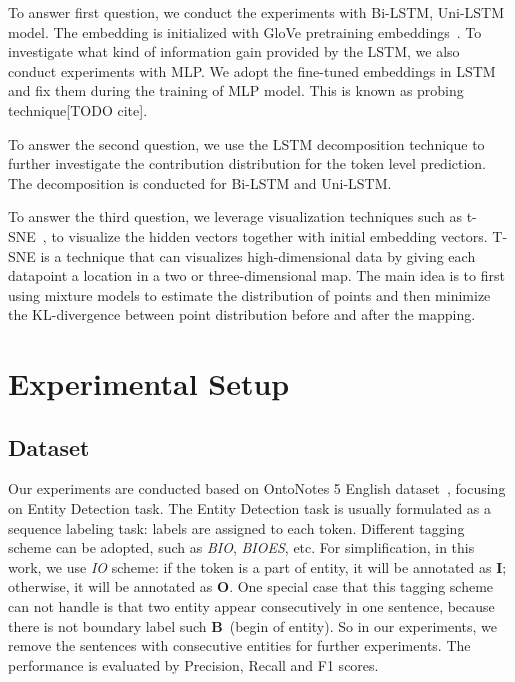 \documentclass{article}
\begin{document}
To answer first question, we conduct the experiments with Bi-LSTM, Uni-LSTM model. The embedding is initialized with GloVe pretraining embeddings~\cite{pennington2014glove}. To investigate what kind of information gain provided by the LSTM, we also conduct experiments with MLP. We adopt the fine-tuned embeddings in LSTM and fix them during the training of MLP model. This is known as probing technique[TODO cite]. 

To answer the second question, we use the LSTM decomposition technique to further investigate the contribution distribution for the token level prediction. The decomposition is conducted for Bi-LSTM and Uni-LSTM. 

To answer the third question, we leverage visualization techniques such as t-SNE~\cite{maaten2008visualizing}, to visualize the hidden vectors together with initial embedding vectors. T-SNE is a technique that can visualizes high-dimensional data by giving each datapoint a location in a two or three-dimensional map. The main idea is to first using mixture models to estimate the distribution of points and then minimize the KL-divergence between point distribution before and after the mapping.


\section{Experimental Setup}


\subsection{Dataset} 

Our experiments are conducted based on OntoNotes 5 English dataset~\cite{weischedel2012ontonotes}, focusing on Entity Detection task. The Entity Detection task is usually formulated as a sequence labeling task: labels are assigned to each token. Different tagging scheme can be adopted, such as \textit{BIO}, \textit{BIOES}, etc. For simplification, in this work, we use \textit{IO} scheme: if the token is a part of entity, it will be annotated as \textbf{I}; otherwise, it will be annotated as \textbf{O}. One special case that this tagging scheme can not handle is that two entity appear consecutively in one sentence, because there is not boundary label such \textbf{B}~(begin of entity). So in our experiments, we remove the sentences with consecutive entities for further experiments. The performance is evaluated by Precision, Recall and F1 scores.
\end{document}
